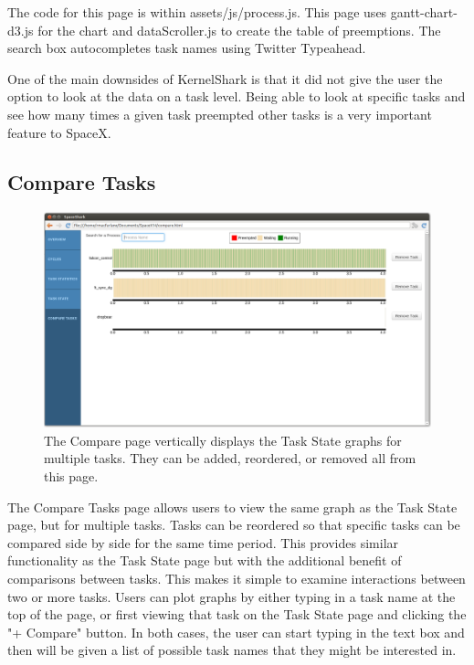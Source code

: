 \documentclass{hmcclinic}
\begin{document}
    The code for this page is within assets/js/process.js. This page uses
    gantt-chart-d3.js for the chart and dataScroller.js to create the table of
    preemptions. The search box autocompletes task names using Twitter
    Typeahead.
    
    One of the main downsides of KernelShark is that it did not give the user the option to look at the data on a task level. Being able to look at specific tasks and see how many times a given task preempted other tasks is a very important feature to SpaceX.
  
  \subsection{Compare Tasks} %
  
  \begin{figure}[H]
  \includegraphics[scale=0.25]{compare-page.png}
  \caption{The Compare page vertically displays the Task State graphs for
  multiple tasks. They can be added, reordered, or removed all from this page.}
  \end{figure}

The Compare Tasks page allows users to view the same graph as the Task State
page, but for multiple tasks. Tasks can be reordered so that specific tasks can
be compared side by side for the same time period. This provides similar
functionality as the Task State page but with the additional benefit of
comparisons between tasks. This makes it simple to examine interactions between
two or more tasks. Users can plot graphs by either typing in a task name at the top of the page, or first viewing that task on the Task State page and clicking the "+ Compare" button. In both cases, the user can start typing in the text box and then will be given a list of possible task names that they might be interested in.
\end{document}
